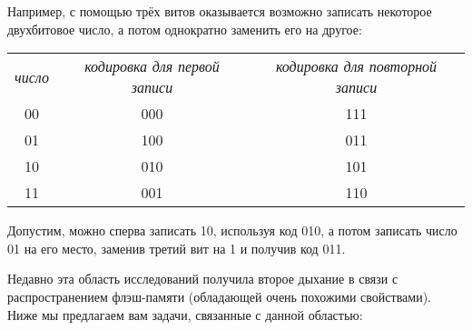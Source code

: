 Например, с помощью трёх витов оказывается возможно записать некоторое двухбитовое
число, а потом однократно заменить его на другое:
\begin{center}
\begin{tabular}{ccc}
{\it число}    & {\it кодировка для первой записи  }   & {\it кодировка для повторной записи}\\
00       & 000                             & 111\\
01       & 100                             & 011\\
10       & 010                             & 101\\
11       & 001                             & 110
\end{tabular}
\end{center}
Допустим, можно сперва записать 10, используя код 010, а потом записать число 01
на его место, заменив третий вит на 1 и получив код 011.

Недавно эта область исследований получила второе дыхание в связи с распространением
флэш-памяти (обладающей очень похожими свойствами). 
Ниже мы предлагаем вам задачи, связанные с данной областью:

